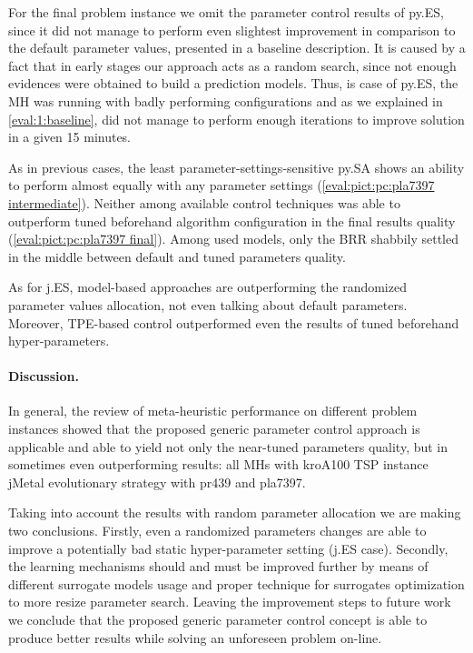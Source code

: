 For the final problem instance we omit the parameter control results of py.ES, since it did not manage to perform even slightest improvement in comparison to the default parameter values, presented in a baseline description. It is caused by a fact that in early stages our approach acts as a random search, since not enough evidences were obtained to build a prediction models. Thus, is case of py.ES, the MH was running with badly performing configurations and as we explained in \cref{eval:1:baseline}, did not manage to perform enough iterations to improve solution in a given 15 minutes.

As in previous cases, the least parameter-settings-sensitive py.SA shows an ability to perform almost equally with any parameter settings (\cref{eval:pict:pc:pla7397 intermediate}). Neither among available control techniques was able to outperform tuned beforehand algorithm configuration in the final results quality (\cref{eval:pict:pc:pla7397 final}). Among used models, only the BRR shabbily settled in the middle between default and tuned parameters quality.

As for j.ES, model-based approaches are outperforming the randomized parameter values allocation, not even talking about default parameters. Moreover, TPE-based control outperformed even the results of tuned beforehand hyper-parameters.


\paragraph{Discussion.} In general, the review of meta-heuristic performance on different problem instances showed that the proposed generic parameter control approach is applicable and able to yield not only the near-tuned parameters quality, but in sometimes even outperforming results: all MHs with kroA100 TSP instance jMetal evolutionary strategy with pr439 and pla7397.

Taking into account the results with random parameter allocation we are making two conclusions. Firstly, even a randomized parameters changes are able to improve a potentially bad static hyper-parameter setting (j.ES case). Secondly, the learning mechanisms should and must be improved further by means of different surrogate models usage and proper technique for surrogates optimization to more resize parameter search. Leaving the improvement steps to future work we conclude that the proposed generic parameter control concept is able to produce better results while solving an unforeseen problem on-line.


